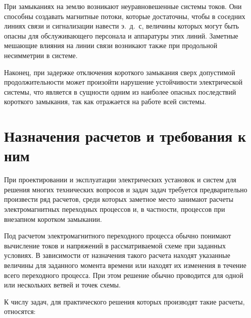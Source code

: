 При замыканиях на землю возникают неуравновешенные системы токов. Они способны создавать магнитные потоки, которые достаточны, чтобы в соседних линиях связи и сигнализации навести э.~д.~с, величины которых могут быть опасны для обслуживающего персонала и аппаратуры этих линий. Заметные мешающие влияния на линии связи возникают также при продольной несимметрии в системе.

Наконец, при задержке отключения короткого замыкания сверх допустимой продолжительности может произойти нарушение устойчивости электрической системы, что является в сущности одним из наиболее опасных последствий короткого замыкания, так как отражается на работе всей системы.

\section{Назначения расчетов и требования к ним}
\label{sec:1-3 naznacheniia_raschetov_i_trebovaniia_k_nim}

При проектировании и эксплуатации электрических установок и систем для решения многих технических вопросов и задач задач требуется предварительно произвести ряд расчетов, среди которых заметное место занимают расчеты электромагнитных переходных процессов и, в частности, процессов при внезапном коротком замыкании.

Под расчетом электромагнитного переходного процесса обычно понимают вычисление токов и напряжений в рассматриваемой схеме при заданных условиях. В зависимости от назначения такого расчета находят указанные величины для заданного момента времени или находят их изменения в течение всего переходного процесса. При этом решение обычно проводится для одной или нескольких ветвей и точек схемы.

К числу задач, для практического решения которых производят такие расчеты, относятся:

